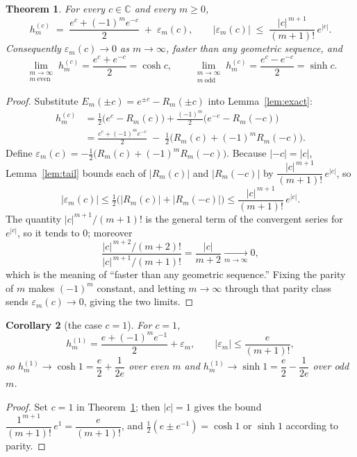 \documentclass[11pt, fleqn]{amsart}
\newtheorem{theorem}{Theorem}[section]
\newtheorem{corollary}[theorem]{Corollary}
\theoremstyle{remark}
\begin{document}
\begin{theorem}\label{thm:main}
For every $c\in\mathbb{C}$ and every $m\ge0$,
\[
h^{(c)}_m\;=\;\frac{e^{c}+(-1)^m e^{-c}}{2}\;+\;\varepsilon_m(c),
\qquad
\bigl|\varepsilon_m(c)\bigr|\;\le\;\frac{|c|^{\,m+1}}{(m+1)!}\,e^{|c|}.
\]
Consequently $\varepsilon_m(c)\to0$ as $m\to\infty$, faster than any geometric
sequence, and
\[
\lim_{\substack{m\to\infty\\ m\ \mathrm{even}}}h^{(c)}_m=\frac{e^{c}+e^{-c}}{2}=\cosh c,
\qquad
\lim_{\substack{m\to\infty\\ m\ \mathrm{odd}}}h^{(c)}_m=\frac{e^{c}-e^{-c}}{2}=\sinh c.
\]
\end{theorem}

\begin{proof}
Substitute $E_m(\pm c)=e^{\pm c}-R_m(\pm c)$ into Lemma~\ref{lem:exact}:
\begin{align*}
h^{(c)}_m
&=\tfrac12\bigl(e^{c}-R_m(c)\bigr)+\tfrac{(-1)^m}{2}\bigl(e^{-c}-R_m(-c)\bigr)\\
&=\frac{e^{c}+(-1)^m e^{-c}}{2}\;-\;\tfrac12\bigl(R_m(c)+(-1)^m R_m(-c)\bigr).
\end{align*}
Define $\varepsilon_m(c)=-\tfrac12\bigl(R_m(c)+(-1)^m R_m(-c)\bigr)$. Because
$|{-c}|=|c|$, Lemma~\ref{lem:tail} bounds each of $|R_m(c)|$ and $|R_m(-c)|$ by
$\dfrac{|c|^{\,m+1}}{(m+1)!}\,e^{|c|}$, so
\[
\bigl|\varepsilon_m(c)\bigr|\le\tfrac12\bigl(|R_m(c)|+|R_m(-c)|\bigr)
\le\frac{|c|^{\,m+1}}{(m+1)!}\,e^{|c|}.
\]
The quantity $|c|^{m+1}/(m+1)!$ is the general term of the convergent series for
$e^{|c|}$, so it tends to $0$; moreover
\[
\frac{|c|^{\,m+2}/(m+2)!}{|c|^{\,m+1}/(m+1)!}=\frac{|c|}{m+2}\xrightarrow[m\to\infty]{}0,
\]
which is the meaning of ``faster than any geometric sequence.'' Fixing the parity
of $m$ makes $(-1)^m$ constant, and letting $m\to\infty$ through that parity class
sends $\varepsilon_m(c)\to0$, giving the two limits.
\end{proof}

\begin{corollary}[the case $c=1$]\label{cor:c1}
For $c=1$,
\[
h^{(1)}_m=\frac{e+(-1)^m e^{-1}}{2}+\varepsilon_m,
\qquad |\varepsilon_m|\le\frac{e}{(m+1)!},
\]
so $h^{(1)}_m\to\cosh 1=\dfrac{e}{2}+\dfrac{1}{2e}$ over even $m$ and
$h^{(1)}_m\to\sinh 1=\dfrac{e}{2}-\dfrac{1}{2e}$ over odd $m$.
\end{corollary}

\begin{proof}
Set $c=1$ in Theorem~\ref{thm:main}; then $|c|=1$ gives the bound
$\dfrac{1^{\,m+1}}{(m+1)!}\,e^{1}=\dfrac{e}{(m+1)!}$, and
$\tfrac12(e\pm e^{-1})=\cosh1$ or $\sinh1$ according to parity.
\end{proof}
\end{document}
